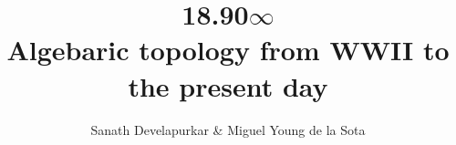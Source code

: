 



\title{%
  18.90$\infty$ \\
    \large Algebaric topology from WWII to the present day%
}

\author{Sanath Develapurkar \& Miguel Young de la Sota}

\maketitle





